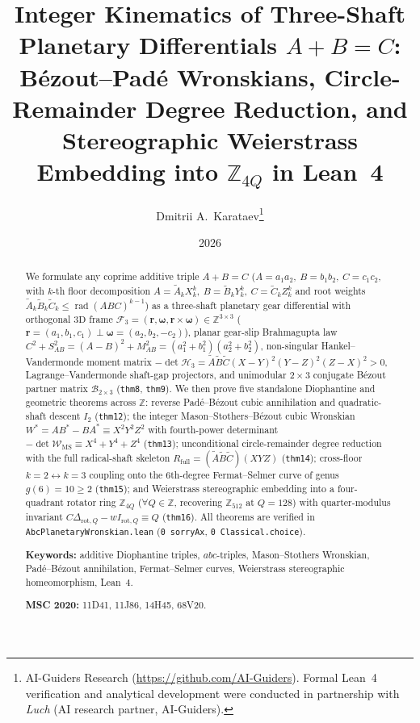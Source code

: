 \documentclass[11pt,a4paper]{article}
\title{\textbf{Integer Kinematics of Three-Shaft Planetary Differentials $A + B = C$:\\ B\'ezout--Pad\'e Wronskians, Circle-Remainder Degree Reduction, and Stereographic Weierstrass Embedding into $\mathbb{Z}_{4Q}$ in Lean~4}}
\author{Dmitrii A.~Karataev\thanks{AI-Guiders Research (\url{https://github.com/AI-Guiders}). Formal Lean~4 verification and analytical development were conducted in partnership with \emph{Luch} (AI research partner, AI-Guiders).}}
\date{2026}
\theoremstyle{plain}
\theoremstyle{definition}
\begin{document}
\maketitle

\begin{abstract}
We formulate any coprime additive triple $A + B = C$ ($A = a_1 a_2,\ B = b_1 b_2,\ C = c_1 c_2$, with $k$-th floor decomposition $A = \widetilde{A}_k X_k^k,\ B = \widetilde{B}_k Y_k^k,\ C = \widetilde{C}_k Z_k^k$ and root weights $\widetilde{A}_k\widetilde{B}_k\widetilde{C}_k \le \operatorname{rad}(ABC)^{k-1}$) as a three-shaft planetary gear differential with orthogonal $3\mathrm{D}$ frame $\mathcal{F}_3 = (\mathbf{r},\mathbf{\omega},\mathbf{r}\times\mathbf{\omega})\in\mathbb{Z}^{3\times 3}$ ($\mathbf{r} = (a_1,b_1,c_1)\perp\mathbf{\omega} = (a_2,b_2,-c_2)$), planar gear-slip Brahmagupta law $C^2 + S_{AB}^2 = (A-B)^2 + M_{AB}^2 = (a_1^2+b_1^2)(a_2^2+b_2^2)$, non-singular Hankel--Vandermonde moment matrix $-\det\mathcal{H}_3 = \widetilde{A}\widetilde{B}\widetilde{C}(X-Y)^2(Y-Z)^2(Z-X)^2 > 0$, Lagrange--Vandermonde shaft-gap projectors, and unimodular $2\times 3$ conjugate B\'ezout partner matrix $\mathcal{B}_{2\times 3}$ (\texttt{thm8}, \texttt{thm9}). We then prove five standalone Diophantine and geometric theorems across $\mathbb{Z}$: reverse Pad\'e--B\'ezout cubic annihilation and quadratic-shaft descent $I_2$ (\texttt{thm12}); the integer Mason--Stothers--B\'ezout cubic Wronskian $W^* = A B^* - B A^* \equiv X^2 Y^2 Z^2$ with fourth-power determinant $-\det\mathcal{W}_{\mathrm{MS}} \equiv X^4 + Y^4 + Z^4$ (\texttt{thm13}); unconditional circle-remainder degree reduction with the full radical-shaft skeleton $R_{\mathrm{full}} = (\widetilde{A}\widetilde{B}\widetilde{C})(X Y Z)$ (\texttt{thm14}); cross-floor $k=2\leftrightarrow k=3$ coupling onto the 6th-degree Fermat--Selmer curve of genus $g(6)=10\ge 2$ (\texttt{thm15}); and Weierstrass stereographic embedding into a four-quadrant rotator ring $\mathbb{Z}_{4Q}$ ($\forall Q\in\mathbb{Z}$, recovering $\mathbb{Z}_{512}$ at $Q=128$) with quarter-modulus invariant $C\Delta_{\mathrm{rot},Q} - w I_{\mathrm{rot},Q} \equiv Q$ (\texttt{thm16}). All theorems are verified in \texttt{AbcPlanetaryWronskian.lean} (\texttt{0 sorryAx}, \texttt{0 Classical.choice}).

\medskip\noindent
\textbf{Keywords:} additive Diophantine triples, $abc$-triples, Mason--Stothers Wronskian, Pad\'e--B\'ezout annihilation, Fermat--Selmer curves, Weierstrass stereographic homeomorphism, Lean~4.

\smallskip\noindent
\textbf{MSC 2020:} 11D41, 11J86, 14H45, 68V20.
\end{abstract}
\end{document}
